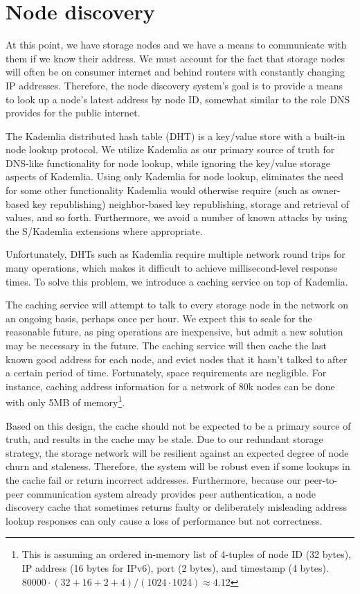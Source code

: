 \documentclass[11pt,fleqn,openany]{book}
\begin{document}
\section{Node discovery}\label{sec:concrete-node-discovery}

At this point, we have storage nodes and we have a means to communicate with
them if we know their address. We must account for the fact that storage nodes
will often be on consumer internet and behind routers with constantly changing IP
addresses. Therefore, the node discovery system's goal is to provide a means to look
up a node's latest address by node ID, somewhat similar to the role DNS
provides for the public internet.

The Kademlia distributed hash table (DHT) is a key/value store with a built-in node lookup protocol.
We utilize Kademlia as our primary source of truth for DNS-like
functionality for node lookup, while ignoring the key/value storage aspects of
Kademlia.
Using only Kademlia for node lookup, eliminates the need for some other
functionality Kademlia would otherwise require (such as owner-based key
republishing) neighbor-based key republishing, storage and retrieval of values,
and so forth. Furthermore, we avoid a number of known attacks by using the
S/Kademlia \cite{skad} extensions where appropriate.

Unfortunately, DHTs such as Kademlia require multiple network round trips for
many operations, which makes it difficult to achieve millisecond-level
response times. To solve this problem, we introduce a caching service on top
of Kademlia.

The caching service will attempt to talk to every storage node in the network
on an ongoing basis, perhaps once per hour. We expect this to scale for the
reasonable future, as ping operations are inexpensive, but admit a new solution
may be necessary in the future.
The caching service will then cache
the last known good address for each node, and evict nodes that it hasn't talked
to after a certain period of time.
Fortunately, space requirements are negligible. For instance, caching address information for a network of 80k nodes
can be done with only 5MB of memory\footnote{
This is assuming an ordered in-memory list of 4-tuples of node ID (32 bytes),
IP address (16 bytes for IPv6), port (2 bytes), and timestamp (4 bytes).
$80000\cdot(32+16+2+4)/(1024\cdot 1024) \approx 4.12$
}.

Based on this design, the cache should not be expected to be a primary source
of truth, and results in the cache may be stale. Due to our redundant
storage strategy, the storage network will be resilient against an expected
degree of node churn and staleness.
Therefore, the system will be robust even if some lookups in the cache
fail or return incorrect addresses.
Furthermore, because our peer-to-peer communication
system already provides peer authentication, a node discovery cache that
sometimes returns faulty
or deliberately misleading address lookup responses can only cause a
loss of performance but not correctness.
\end{document}
